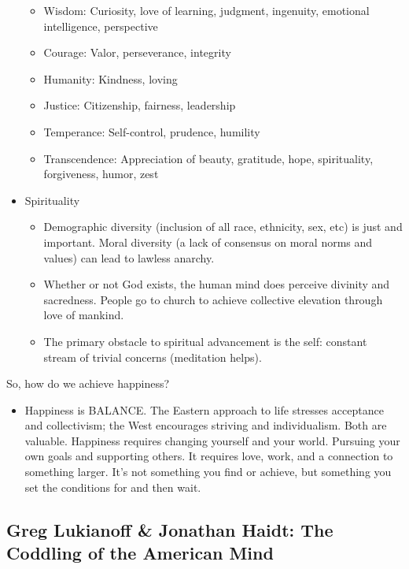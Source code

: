 \documentclass[
]{article}
\providecommand{\tightlist}{%
  \setlength{\itemsep}{0pt}\setlength{\parskip}{0pt}}
\begin{document}
\begin{itemize}
  \begin{itemize}
  \item
    Wisdom: Curiosity, love of learning, judgment, ingenuity, emotional
    intelligence, perspective
  \item
    Courage: Valor, perseverance, integrity
  \item
    Humanity: Kindness, loving
  \item
    Justice: Citizenship, fairness, leadership
  \item
    Temperance: Self-control, prudence, humility
  \item
    Transcendence: Appreciation of beauty, gratitude, hope,
    spirituality, forgiveness, humor, zest
  \end{itemize}
\item
  Spirituality

  \begin{itemize}
  \item
    Demographic diversity (inclusion of all race, ethnicity, sex, etc)
    is just and important. Moral diversity (a lack of consensus on moral
    norms and values) can lead to lawless anarchy.
  \item
    Whether or not God exists, the human mind does perceive divinity and
    sacredness. People go to church to achieve collective elevation
    through love of mankind.
  \item
    The primary obstacle to spiritual advancement is the self: constant
    stream of trivial concerns (meditation helps).
  \end{itemize}
\end{itemize}

So, how do we achieve happiness?

\begin{itemize}
\tightlist
\item
  Happiness is BALANCE. The Eastern approach to life stresses acceptance
  and collectivism; the West encourages striving and individualism. Both
  are valuable. Happiness requires changing yourself and your world.
  Pursuing your own goals and supporting others. It requires love, work,
  and a connection to something larger. It's not something you find or
  achieve, but something you set the conditions for and then wait.
\end{itemize}

\hypertarget{greg-lukianoff-jonathan-haidt-the-coddling-of-the-american-mind}{%
\subsection{Greg Lukianoff \& Jonathan Haidt: The Coddling of the
American
Mind}\label{greg-lukianoff-jonathan-haidt-the-coddling-of-the-american-mind}}
\end{document}
